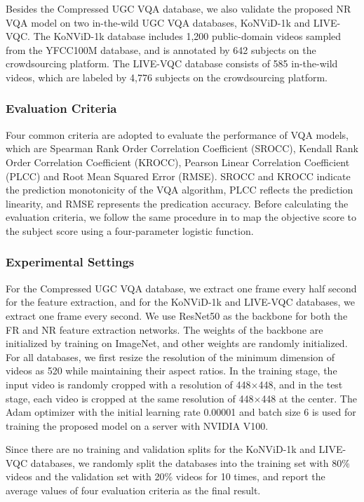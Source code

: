 \documentclass{article}
\begin{document}
Besides the Compressed UGC VQA database, we also validate the proposed NR VQA model on two in-the-wild UGC VQA databases, KoNViD-1k\cite{hosu2017konstanz} and LIVE-VQC\cite{sinno2018large}. The KoNViD-1k database includes 1,200 public-domain videos sampled from the YFCC100M database, and is annotated by 642 subjects on the crowdsourcing platform. The LIVE-VQC database consists of 585 in-the-wild videos, which are labeled by 4,776 subjects on the crowdsourcing platform.

\subsubsection{Evaluation Criteria}
\vspace{-0.2cm}
Four common criteria are adopted to evaluate the performance of VQA models, which are Spearman Rank Order Correlation Coefficient (SROCC), Kendall Rank Order Correlation Coefficient (KROCC), Pearson Linear Correlation Coefficient (PLCC) and Root Mean Squared Error (RMSE). SROCC and KROCC indicate the prediction monotonicity of the VQA algorithm, PLCC reflects the prediction linearity, and RMSE represents the predication accuracy. Before calculating the evaluation criteria, we follow the same procedure in \cite{li2019quality} to map the objective score to the subject score using a four-parameter logistic function.

\subsubsection{Experimental Settings}

For the Compressed UGC VQA database, we extract one frame every half second for the feature extraction, and for the KoNViD-1k and LIVE-VQC databases, we extract one frame every second. We use ResNet50 \cite{he2016deep} as the backbone for both the FR and NR feature extraction networks. The weights of the backbone are initialized by training on ImageNet, and other weights are randomly initialized. For all databases, we first resize the resolution of the minimum dimension of videos as 520 while maintaining their aspect ratios. In the training stage, the input video is randomly cropped with a resolution of 448$\times$448, and in the test stage, each video is cropped at the same resolution of 448$\times$448 at the center. The Adam optimizer with the initial learning rate 0.00001 and batch size 6 is used for training the proposed model on a server with NVIDIA V100.

Since there are no training and validation splits for the KoNViD-1k and LIVE-VQC databases, we randomly split the databases into the training set with 80\% videos and the validation set with 20\% videos for 10 times, and report the average values of four evaluation criteria as the final result.
\end{document}
